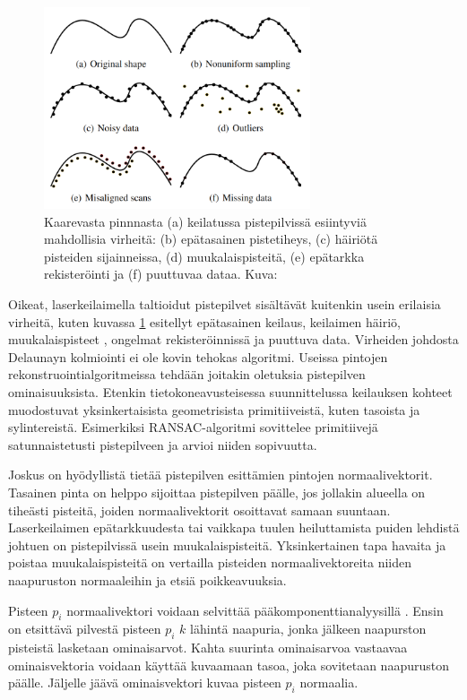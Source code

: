 \begin{figure}
    \centering
    \includegraphics[width=0.7\textwidth]{img/artifacts.png}
    \caption{Kaarevasta pinnnasta (a) keilatussa pistepilvissä esiintyviä mahdollisia virheitä: (b) epätasainen pistetiheys, (c) häiriötä pisteiden sijainneissa, (d) muukalaispisteitä, (e) epätarkka rekisteröinti ja (f) puuttuvaa dataa. Kuva: \cite{berger}}
    \label{img:artifacts}
\end{figure}

Oikeat, laserkeilaimella taltioidut pistepilvet sisältävät kuitenkin usein erilaisia virheitä, kuten kuvassa \ref{img:artifacts} esitellyt epätasainen keilaus, keilaimen häiriö, muukalaispisteet , ongelmat rekisteröinnissä ja puuttuva data. Virheiden johdosta Delaunayn kolmiointi ei ole kovin tehokas algoritmi. Useissa pintojen rekonstruointialgoritmeissa tehdään joitakin oletuksia pistepilven ominaisuuksista. Etenkin tietokoneavusteisessa suunnittelussa keilauksen kohteet muodostuvat yksinkertaisista geometrisista primitiiveistä, kuten tasoista ja sylintereistä. Esimerkiksi RANSAC-algoritmi \cite{ransac} sovittelee primitiivejä satunnaistetusti pistepilveen ja arvioi niiden sopivuutta. \cite{berger} 

Joskus on hyödyllistä tietää pistepilven esittämien pintojen normaalivektorit. Tasainen pinta on helppo sijoittaa pistepilven päälle, jos jollakin alueella on tiheästi pisteitä, joiden normaalivektorit osoittavat samaan suuntaan. Laserkeilaimen epätarkkuudesta tai vaikkapa tuulen heiluttamista puiden lehdistä johtuen on pistepilvissä usein muukalaispisteitä. Yksinkertainen tapa havaita ja poistaa muukalaispisteitä on vertailla pisteiden normaalivektoreita niiden naapuruston normaaleihin ja etsiä poikkeavuuksia. 

Pisteen $p_i$ normaalivektori voidaan selvittää pääkomponenttianalyysillä . Ensin on etsittävä pilvestä pisteen $p_i$ $k$ lähintä naapuria, jonka jälkeen naapurston pisteistä lasketaan ominaisarvot. Kahta suurinta ominaisarvoa vastaavaa ominaisvektoria voidaan käyttää kuvaamaan tasoa, joka sovitetaan naapuruston päälle. Jäljelle jäävä ominaisvektori kuvaa pisteen $p_i$ normaalia. \cite{huang}


